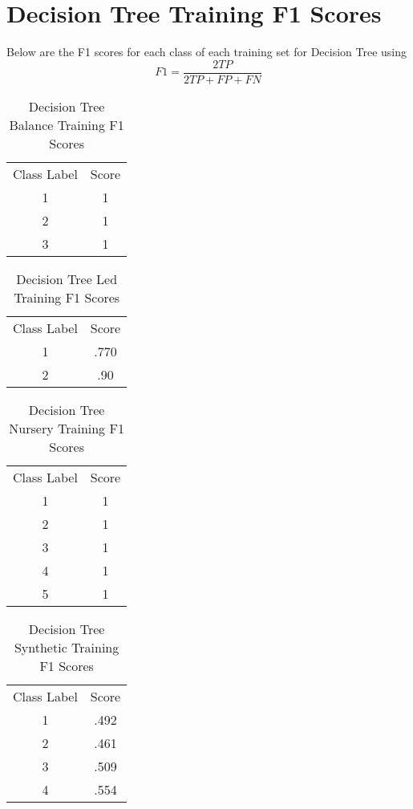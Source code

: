 \documentclass{article}
\begin{document}
\section*{Decision Tree Training F1 Scores}
Below are the F1 scores for each class of each training set for Decision Tree using $$F1 = \frac{2TP}{2TP + FP + FN}$$
\begin{table}[htbp]
\caption{Decision Tree Balance Training F1 Scores}
\begin{tabular}{ |c|c| }
 \hline
 Class Label & Score\\
 1 & 1\\
 2 & 1\\
 3 & 1\\
 \hline
\end{tabular}
\end{table}
\begin{table}[htbp]
\caption{Decision Tree Led Training F1 Scores}
\begin{tabular}{ |c|c| }
 \hline
 Class Label & Score\\
 1 & .770\\
 2 & .90\\
 \hline
\end{tabular}
\end{table}
\begin{table}[H]
\caption{Decision Tree Nursery Training F1 Scores}
\begin{tabular}{ |c|c| }
 \hline
 Class Label & Score\\
 1 & 1\\
 2 & 1\\
 3 & 1\\
 4 & 1\\
 5 & 1\\
 \hline
\end{tabular}
\end{table}
\begin{table}[H]
\caption{Decision Tree Synthetic Training F1 Scores}
\begin{tabular}{ |c|c| }
 \hline
 Class Label & Score\\
 1 & .492\\
 2 & .461\\
 3 & .509\\
 4 & .554\\
 \hline
\end{tabular}
\end{table}
\end{document}
